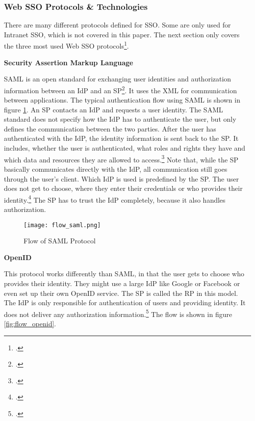 \subsubsection{Web SSO Protocols \& Technologies}

There are many different protocols defined for \ac{SSO}.
Some are only used for Intranet \ac{SSO}, which is not covered in this paper.
The next section only covers the three most used Web \ac{SSO} protocols\footcite[Cp.][]{OneLoginFIMTechnologies}.

\textbf{Security Assertion Markup Language}

\ac{SAML} is an open standard for exchanging user identities and authorization information between
an \ac{IdP} and an \ac{SP}\footcite[Cp.][p. 1]{Gross}.
It uses the \ac{XML} for communication between applications.
The typical authentication flow using \ac{SAML} is shown in figure \ref{fig:flow_saml}.
An \ac{SP} contacts an \ac{IdP} and requests a user identity.
The \ac{SAML} standard does not specify how the \ac{IdP} has to authenticate the user,
but only defines the communication between the two parties.
After the user has authenticated with the \ac{IdP}, the identity information is sent back to 
the \ac{SP}. It includes, whether the user is authenticated, what roles and rights they have and
which data and resources they are allowed to access.\footcite[Cp.][p. 137]{Radha2012}
Note that, while the \ac{SP} basically communicates directly with the \ac{IdP}, all communication
still goes through the user's client. Which \ac{IdP} is used is predefined by the \ac{SP}. The user does not
get to choose, where they enter their credentials or who provides their identity.\footcite[Cp.][p. 21]{Bazaz2016}
The \ac{SP} has to trust the \ac{IdP} completely, because it also handles authorization. 

\begin{figure}[H]
    \centering
    \caption{Flow of SAML Protocol}
	\label{fig:flow_saml}
    \texttt{[image: flow\_saml.png]}
    \\
    \cite[Source:][p. 21]{Bazaz2016}
\end{figure}

\textbf{OpenID}

This protocol works differently than \ac{SAML}, in that the user gets to choose who provides their identity.
They might use a large \ac{IdP} like Google or Facebook or even set up their own OpenID service.
The \ac{SP} is called the \ac{RP} in this model. The \ac{IdP} is only responsible for authentication of users
and providing identity. It does not deliver any authorization information.\footcite[Cp.][p. 21]{Bazaz2016}
The flow is shown in figure \ref{fig:flow_openid}.

